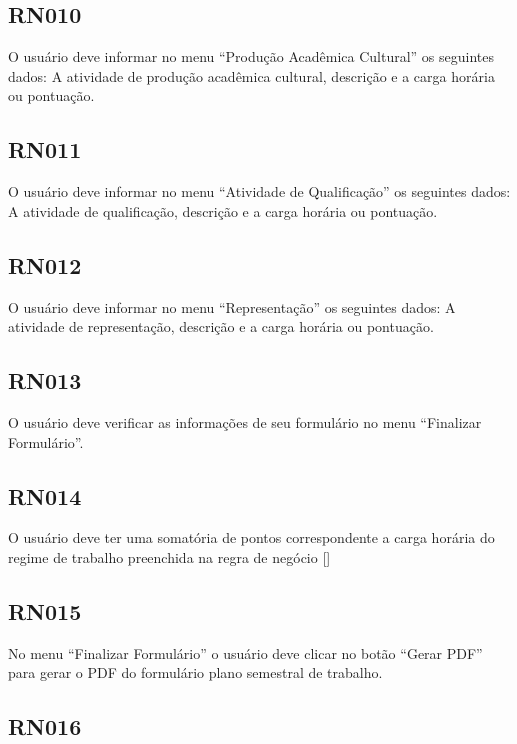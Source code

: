 \subsection{RN010}\label{rn010}

O usuário deve informar no menu ``Produção Acadêmica Cultural'' os seguintes dados: A atividade de produção acadêmica cultural, descrição e a carga horária ou pontuação.

\subsection{RN011}\label{rn011}

O usuário deve informar no menu ``Atividade de Qualificação'' os seguintes dados: A atividade de qualificação, descrição e a carga horária ou pontuação.

\subsection{RN012}\label{rn012}

O usuário deve informar no menu ``Representação'' os seguintes dados: A atividade de representação, descrição e a carga horária ou pontuação.

\subsection{RN013}\label{rn013}

O usuário deve verificar as informações de seu formulário no menu ``Finalizar Formulário''.

\subsection{RN014}\label{rn014}

O usuário deve ter uma somatória de pontos correspondente a carga horária do regime de trabalho preenchida na regra de negócio []

\subsection{RN015}\label{rn015}

No menu ``Finalizar Formulário'' o usuário deve clicar no botão ``Gerar PDF'' para gerar o \ac{PDF} do formulário plano semestral de trabalho.

\subsection{RN016}\label{rn016}

